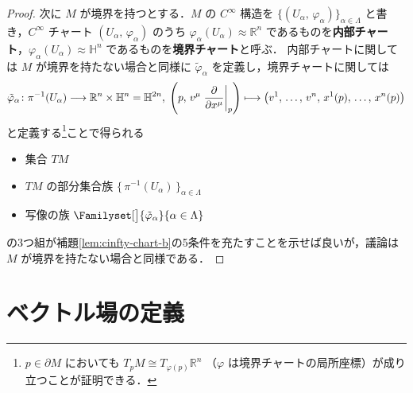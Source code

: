 \documentclass[TQFT_main]{subfiles}
\begin{document}
\begin{proof}
    次に $M$ が境界を持つとする．$M$ の $C^\infty$ 構造を $\{(U_\alpha,\, \varphi_\alpha)\}_{\alpha \in \Lambda}$ と書き，$C^\infty$ チャート $(U_\alpha,\, \varphi_\alpha)$ のうち $\varphi_\alpha(U_\alpha) \approx \mathbb{R}^n$ であるものを\textbf{内部チャート}，$\varphi_\alpha(U_\alpha) \approx \mathbb{H}^n$ であるものを\textbf{境界チャート}と呼ぶ．
    内部チャートに関しては $M$ が境界を持たない場合と同様に $\tilde{\varphi}_\alpha$ を定義し，境界チャートに関しては
    \begin{align}
        \tilde{\varphi}_\alpha \colon \pi^{-1} (U_\alpha) \lto \mathbb{R}^{n} \times \mathbb{H}^n = \mathbb{H}^{2n},\; \left(p,\, v^\mu \eval{\pdv{}{x^\mu}}_p \right) \lmto \bigl( v^1,\, \dots,\, v^n,\, x^1 (p),\, \dots,\, x^n(p) \bigr)
    \end{align}
    と定義する\footnote{$p \in \partial M$ においても $T_p M \cong T_{\varphi(p)} \mathbb{R}^n$ （$\varphi$ は境界チャートの局所座標）が成り立つことが証明できる．}ことで得られる
    \begin{itemize}
        \item 集合 $TM$
        \item $TM$ の部分集合族 $\bigl\{\, \pi^{-1}(U_\alpha) \,\bigr\}_{\alpha \in \Lambda}$
        \item 写像の族 $\Familyset[\big]{\tilde{\varphi}_\alpha}{\alpha \in \Lambda}$
    \end{itemize}
    の3つ組が補題\ref{lem:cinfty-chart-b}の5条件を充たすことを示せば良いが，議論は $M$ が境界を持たない場合と同様である．
\end{proof}

\section{ベクトル場の定義}
\end{document}
